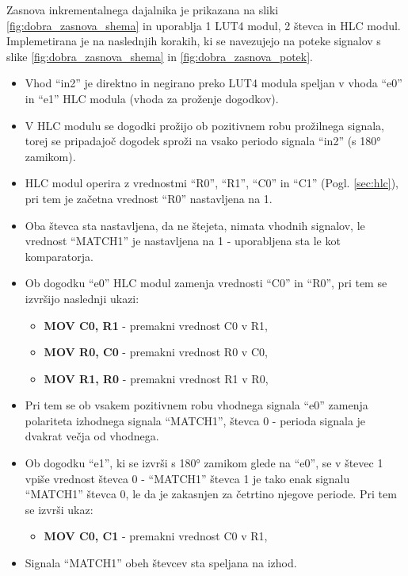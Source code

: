 \documentclass[a4paper]{article}
\begin{document}
\begin{sloppypar}
Zasnova inkrementalnega dajalnika je prikazana na sliki
\ref{fig:dobra_zasnova_shema} in uporablja 1 LUT4 modul, 2 števca in HLC modul.
Implemetirana je na naslednjih korakih, ki se navezujejo na poteke signalov s
slike \ref{fig:dobra_zasnova_shema} in \ref{fig:dobra_zasnova_potek}.
\begin{itemize}
    \item Vhod ``in2'' je direktno in negirano preko LUT4 modula speljan v
        vhoda ``e0'' in ``e1'' HLC modula (vhoda za proženje dogodkov).
    \item V HLC modulu se dogodki prožijo ob pozitivnem robu prožilnega
        signala, torej se pripadajoč dogodek sproži na vsako periodo signala
        ``in2'' (s 180° zamikom).
    \item HLC modul operira z vrednostmi ``R0'', ``R1'', ``C0'' in ``C1''
        (Pogl. \ref{sec:hlc}), pri tem je začetna vrednost ``R0'' nastavljena
        na 1.
    \item Oba števca sta nastavljena, da ne štejeta, nimata vhodnih signalov,
        le vrednost ``MATCH1'' je nastavljena na 1 - uporabljena sta le kot
        komparatorja.
    \item Ob dogodku ``e0'' HLC modul zamenja vrednosti ``C0'' in ``R0'', pri
        tem se izvršijo naslednji ukazi:
    \begin{itemize}
        \item \textbf{MOV C0, R1} - premakni vrednost C0 v R1,
        \item \textbf{MOV R0, C0} - premakni vrednost R0 v C0,
        \item \textbf{MOV R1, R0} - premakni vrednost R1 v R0,
    \end{itemize}
    \item Pri tem se ob vsakem pozitivnem robu vhodnega signala ``e0'' zamenja
        polariteta izhodnega signala ``MATCH1'', števca 0 - perioda signala je
        dvakrat večja od vhodnega.
    \item Ob dogodku ``e1'', ki se izvrši s 180° zamikom glede na ``e0'', se v
        števec 1 vpiše vrednost števca 0 - ``MATCH1'' števca 1 je tako enak
        signalu ``MATCH1'' števca 0, le da je zakasnjen za četrtino njegove
        periode. Pri tem se izvrši ukaz:
    \begin{itemize}
        \item \textbf{MOV C0, C1} - premakni vrednost C0 v R1,
    \end{itemize}
    \item Signala ``MATCH1'' obeh števcev sta speljana na izhod.
\end{itemize}


\end{sloppypar}
\end{document}
